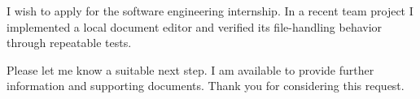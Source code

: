 I wish to apply for the software engineering internship. In a recent team project I implemented a local document editor and verified its file-handling behavior through repeatable tests.

Please let me know a suitable next step. I am available to provide further information and supporting documents. Thank you for considering this request.
